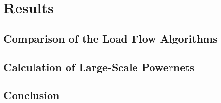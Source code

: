 \chapter{Results}
\label{sec:results}

\section{Comparison of the Load Flow Algorithms}
\label{sec:comparison_algorithms}

\section{Calculation of Large-Scale Powernets}
\label{sec:large_scale_powernets}

\section{Conclusion}